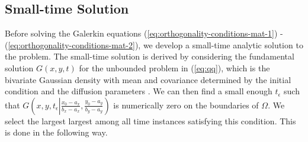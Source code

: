 \documentclass[10pt]{article}
\begin{document}
\subsection{Small-time Solution}
Before solving the Galerkin equations
(\ref{eq:orthogonality-conditions-mat-1}) -
(\ref{eq:orthogonality-conditions-mat-2}), we develop a small-time
analytic solution to the problem. The small-time solution is derived
by considering the fundamental solution $G(x,y,t)$ for the unbounded
problem in (\ref{eq:qq}), which is the bivariate Gaussian density with
mean and covariance determined by the initial condition and the
diffusion parameters \citep{stakgold2011green}. We can then find a
small enough $t_\epsilon$ such that
$G\left(x,y, t_\epsilon \left| \frac{x_0-a_x}{b_x - a_x},
    \frac{y_0-a_y}{b_y - a_y} \right.\right)$ is numerically zero on
the boundaries of $\Omega$. We select the largest largest among all
time instances satisfying this condition. This is done in the
following way.
\end{document}
